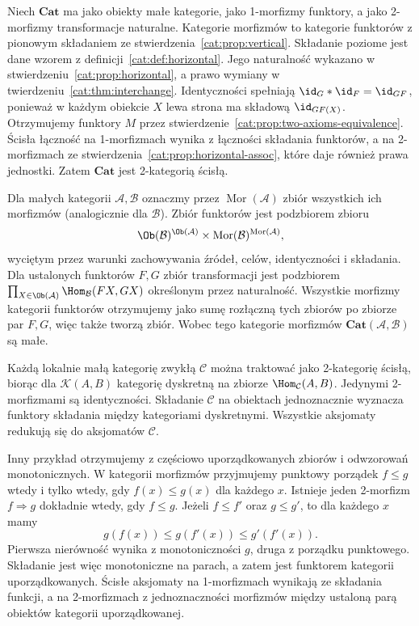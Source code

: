 \begin{przyklad}\label{cat:ex:two-cat}
Niech $\mathbf{Cat}$ ma jako obiekty małe kategorie, jako 1-morfizmy funktory, a jako 2-morfizmy transformacje naturalne. Kategorie morfizmów to kategorie funktorów z pionowym składaniem ze stwierdzenia~\ref{cat:prop:vertical}. Składanie poziome jest dane wzorem z definicji~\ref{cat:def:horizontal}. Jego naturalność wykazano w stwierdzeniu~\ref{cat:prop:horizontal}, a prawo wymiany w twierdzeniu~\ref{cat:thm:interchange}. Identyczności spełniają $\id_G\ast\id_F=\id_{GF}$, ponieważ w każdym obiekcie $X$ lewa strona ma składową $\id_{GF(X)}$. Otrzymujemy funktory $M$ przez stwierdzenie~\ref{cat:prop:two-axioms-equivalence}. Ścisła łączność na 1-morfizmach wynika z łączności składania funktorów, a na 2-morfizmach ze stwierdzenia~\ref{cat:prop:horizontal-assoc}, które daje również prawa jednostki. Zatem $\mathbf{Cat}$ jest 2-kategorią ścisłą.

Dla małych kategorii $\mathcal A,\mathcal B$ oznaczmy przez $\operatorname{Mor}(\mathcal A)$ zbiór wszystkich ich morfizmów (analogicznie dla $\mathcal B$). Zbiór funktorów jest podzbiorem zbioru
\[
 \Ob(\mathcal B)^{\Ob(\mathcal A)}
 \times\operatorname{Mor}(\mathcal B)^{\operatorname{Mor}(\mathcal A)},
\]
wyciętym przez warunki zachowywania źródeł, celów, identyczności i składania. Dla ustalonych funktorów $F,G$ zbiór transformacji jest podzbiorem $\prod_{X\in\Ob(\mathcal A)}\Hom_{\mathcal B}(FX,GX)$ określonym przez naturalność. Wszystkie morfizmy kategorii funktorów otrzymujemy jako sumę rozłączną tych zbiorów po zbiorze par $F,G$, więc także tworzą zbiór. Wobec tego kategorie morfizmów $\mathbf{Cat}(\mathcal A,\mathcal B)$ są małe.
\end{przyklad}

\begin{przyklad}\label{cat:ex:two-locally-discrete}
Każdą lokalnie małą kategorię zwykłą $\mathcal C$ można traktować jako 2-kategorię ścisłą, biorąc dla $\mathcal K(A,B)$ kategorię dyskretną na zbiorze $\Hom_{\mathcal C}(A,B)$. Jedynymi 2-morfizmami są identyczności. Składanie $\mathcal C$ na obiektach jednoznacznie wyznacza funktory składania między kategoriami dyskretnymi. Wszystkie aksjomaty redukują się do aksjomatów $\mathcal C$.

Inny przykład otrzymujemy z częściowo uporządkowanych zbiorów i odwzorowań monotonicznych. W kategorii morfizmów przyjmujemy punktowy porządek $f\leq g$ wtedy i tylko wtedy, gdy $f(x)\leq g(x)$ dla każdego $x$. Istnieje jeden 2-morfizm $f\Rightarrow g$ dokładnie wtedy, gdy $f\leq g$. Jeżeli $f\leq f'$ oraz $g\leq g'$, to dla każdego $x$ mamy
\[
 g(f(x))\leq g(f'(x))\leq g'(f'(x)).
\]
Pierwsza nierówność wynika z monotoniczności $g$, druga z porządku punktowego. Składanie jest więc monotoniczne na parach, a zatem jest funktorem kategorii uporządkowanych. Ścisłe aksjomaty na 1-morfizmach wynikają ze składania funkcji, a na 2-morfizmach z jednoznaczności morfizmów między ustaloną parą obiektów kategorii uporządkowanej.
\end{przyklad}

